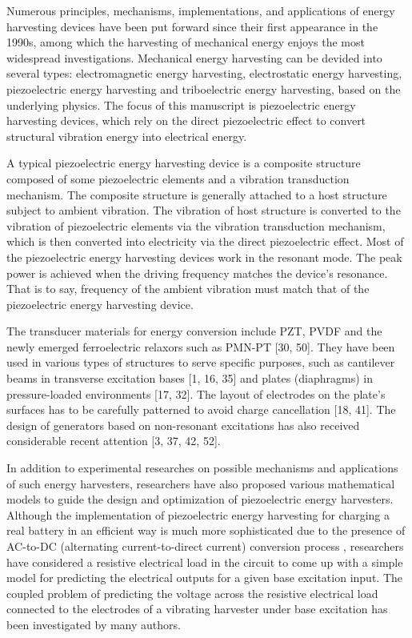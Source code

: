 \documentclass{article}
\begin{document}
Numerous principles, mechanisms, implementations, and applications of energy harvesting devices have been put forward since their first appearance in the 1990s, \cite{beeby2006energy,anton2007review,zhou2018review,safaei2019review} among which the harvesting of mechanical energy enjoys the most widespread investigations. Mechanical energy harvesting can be devided into several types: electromagnetic energy harvesting, electrostatic energy harvesting, piezoelectric energy harvesting and triboelectric energy harvesting, based on the underlying physics. The focus of this manuscript is piezoelectric energy harvesting devices, which rely on the direct piezoelectric effect to convert structural vibration energy into electrical energy. 

A typical piezoelectric energy harvesting device is a composite structure composed of some piezoelectric elements and a vibration transduction mechanism. The composite structure is generally attached to a host structure subject to ambient vibration. The vibration of host structure is converted to the vibration of piezoelectric elements via the vibration transduction mechanism, which is then converted into electricity via the direct piezoelectric effect. Most of the piezoelectric energy harvesting devices work in the resonant mode. The peak power is achieved when the driving frequency matches the device’s
resonance. \cite{roundy2003study} That is to say, frequency of the ambient vibration must match that of the piezoelectric energy harvesting device. 

The transducer materials for energy conversion include PZT, PVDF and the newly emerged ferroelectric relaxors such as PMN-PT [30, 50]. They have been used in
various types of structures to serve specific purposes, such as cantilever beams in transverse excitation bases [1, 16, 35] and plates (diaphragms) in pressure-loaded environments [17, 32]. The layout of electrodes on the plate's surfaces has to be carefully patterned to avoid charge cancellation [18, 41]. The design of generators based on non-resonant excitations has also received considerable recent attention [3, 37, 42, 52].

In addition to experimental researches on possible mechanisms and applications of such energy harvesters, researchers have also proposed various mathematical models to guide the design and optimization of piezoelectric energy harvesters. Although the implementation of piezoelectric energy harvesting for charging a real battery in an efficient way is much more sophisticated due to the presence of AC-to-DC (alternating current-to-direct current) conversion process \cite{shu2006analysis,shu2007improved,qiu2009comparison}, researchers have considered a resistive electrical load in the circuit to come up with a simple model for predicting the electrical outputs for a given base excitation input. The coupled problem of predicting the voltage across the resistive electrical load connected to the electrodes of a vibrating harvester under base excitation has been investigated by many authors. 
\end{document}
